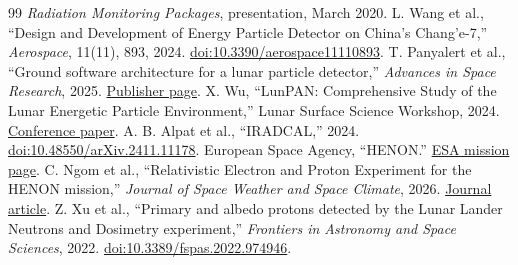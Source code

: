 \begin{thebibliography}{99}
 \textit{Radiation Monitoring Packages}, presentation, March 2020.
 L. Wang et al., ``Design and Development of Energy Particle Detector on China's Chang'e-7,'' \textit{Aerospace}, 11(11), 893, 2024. \href{https://doi.org/10.3390/aerospace11110893}{doi:10.3390/aerospace11110893}.
 T. Panyalert et al., ``Ground software architecture for a lunar particle detector,'' \textit{Advances in Space Research}, 2025. \href{https://www.sciencedirect.com/science/article/pii/S0273117725011056}{Publisher page}.
 X. Wu, ``LunPAN: Comprehensive Study of the Lunar Energetic Particle Environment,'' Lunar Surface Science Workshop, 2024. \href{https://www.hou.usra.edu/meetings/lunarsurface24/pdf/5024.pdf}{Conference paper}.
 A. B. Alpat et al., ``IRADCAL,'' 2024. \href{https://doi.org/10.48550/arXiv.2411.11178}{doi:10.48550/arXiv.2411.11178}.
 European Space Agency, ``HENON.'' \href{https://www.esa.int/Enabling_Support/Space_Engineering_Technology/Technology_CubeSats/HENON}{ESA mission page}.
 C. Ngom et al., ``Relativistic Electron and Proton Experiment for the HENON mission,'' \textit{Journal of Space Weather and Space Climate}, 2026. \href{https://www.swsc-journal.org/articles/swsc/full_html/2026/01/swsc250091/swsc250091.html}{Journal article}.
 Z. Xu et al., ``Primary and albedo protons detected by the Lunar Lander Neutrons and Dosimetry experiment,'' \textit{Frontiers in Astronomy and Space Sciences}, 2022. \href{https://doi.org/10.3389/fspas.2022.974946}{doi:10.3389/fspas.2022.974946}.
\end{thebibliography}
